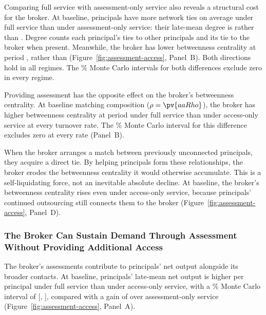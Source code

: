 Comparing full service with assessment-only service also reveals a structural cost for the broker. At baseline, principals have more network ties on average under full service than under assessment-only service: their late-mean degree is  rather than . Degree counts each principal's ties to other principals and its tie to the broker when present. Meanwhile, the broker has lower betweenness centrality at period ,  rather than  (Figure~\ref{fig:assessment-access}, Panel~B). Both directions hold in all  regimes. The \% Monte Carlo intervals for both differences exclude zero in every regime.

Providing assessment has the opposite effect on the broker's betweenness centrality. At baseline matching composition ($\rho=\pv{aaRho}$), the broker has higher betweenness centrality at period  under full service than under access-only service at every turnover rate. The \% Monte Carlo interval for this difference excludes zero at every rate (Panel~B).

When the broker arranges a match between previously unconnected principals, they acquire a direct tie. By helping principals form these relationships, the broker erodes the betweenness centrality it would otherwise accumulate. This is a self-liquidating force, not an inevitable absolute decline. At baseline, the broker's betweenness centrality rises even under access-only service, because principals' continued outsourcing still connects them to the broker (Figure~\ref{fig:assessment-access}, Panel~D).

\subsubsection{The Broker Can Sustain Demand Through Assessment Without Providing Additional Access}

The broker's assessments contribute to principals' net output alongside its broader contacts. At baseline, principals' late-mean net output is  higher per principal under full service than under access-only service, with a \% Monte Carlo interval of [, ], compared with a gain of  over assessment-only service (Figure~\ref{fig:assessment-access}, Panel~A).

